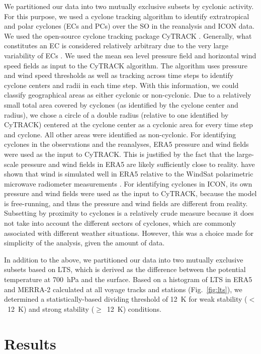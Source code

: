 \documentclass[draft]{agujournal2019}
\begin{document}
We partitioned our data into two mutually exclusive subsets by cyclonic activity. For this purpose, we used a cyclone tracking algorithm to identify extratropical and polar cyclones (ECs and PCs) over the SO in the reanalysis and ICON data. We used the open-source cyclone tracking package CyTRACK \cite{perez-alarcon2024}. Generally, what constitutes an EC is considered relatively arbitrary due to the very large variability of ECs \cite{neu2013}. We used the mean sea level pressure field and horizontal wind speed fields as input to the CyTRACK algorithm. The algorithm uses pressure and wind speed thresholds as well as tracking across time steps to identify cyclone centers and radii in each time step. With this information, we could classify geographical areas as either cyclonic or non-cyclonic. Due to a relatively small total area covered by cyclones (as identified by the cyclone center and radius), we chose a circle of a double radius (relative to one identified by CyTRACK) centered at the cyclone center as a cyclonic area for every time step and cyclone. All other areas were identified as non-cyclonic. For identifying cyclones in the observations and the reanalyses, ERA5 pressure and wind fields were used as the input to CyTRACK. This is justified by the fact that the large-scale pressure and wind fields in ERA5 are likely sufficiently close to reality.  have shown that wind is simulated well in ERA5 relative to the WindSat polarimetric microwave radiometer measurements \cite{meissner2009}. For identifying cyclones in ICON, its own pressure and wind fields were used as the input to CyTRACK, because the model is free-running, and thus the pressure and wind fields are different from reality. Subsetting by proximity to cyclones is a relatively crude measure because it does not take into account the different sectors of cyclones, which are commonly associated with different weather situations. However, this was a choice made for simplicity of the analysis, given the amount of data.

In addition to the above, we partitioned our data into two mutually exclusive subsets based on LTS, which is derived as the difference between the potential temperature at 700~hPa and the surface. Based on a histogram of LTS in ERA5 and MERRA-2 calculated at all voyage tracks and stations (Fig.~\ref{fig:lts}), we determined a statistically-based dividing threshold of 12~K for weak stability ($<$~12~K) and strong stability ($\geq$~12~K) conditions.

\section{Results}
\label{sec:results}
\end{document}
